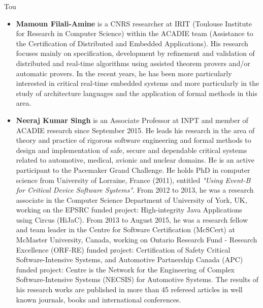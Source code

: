 \begin{sitedescription}{Tou}
\begin{itemize}
\item{\bf  Mamoun Filali-Amine}  is a CNRS researcher at IRIT (Toulouse Institute for Research in Computer Science)
within the ACADIE team (Assistance to the Certification of Distributed and Embedded Applications).
His research focuses mainly on specification, development by refinement and validation of distributed and real-time algorithms using  assisted theorem provers and/or automatic provers. In the recent years, he has been more particularly interested in critical real-time embedded systems and more particularly in the study of architecture languages and the application of formal methods in this area.


\item{\bf   Neeraj Kumar Singh} is an Associate Professor at INPT and member of  ACADIE research since September 2015. He leads his research in the area of theory and practice of rigorous software engineering and formal methods to design and implementation of safe, secure and dependable critical systems related to automotive, medical, avionic and nuclear domains. He is an active participant to the Pacemaker Grand Challenge. He holds PhD in computer science from University of Lorraine, France (2011), entitled  \textit{"Using Event-B for Critical Device Software Systems"}. From  2012 to  2013, he was a research associate in the Computer Science Department of University of York, UK, working on the  EPSRC funded project: High-integrity Java Applications using Circus (HiJaC). From 2013 to August 2015, he was a research fellow and team leader in the Centre for Software Certification (McSCert) at McMaster University, Canada, working on Ontario Research Fund - Research Excellence (ORF-RE) funded project: Certification of Safety Critical Software-Intensive Systems, and Automotive Partnership Canada (APC) funded project: Centre is the Network for the Engineering of Complex Software-Intensive Systems (NECSIS) for Automotive Systems.  The results of his research works are published in more than 45 refereed articles in well known journals, books and international conferences.




\end{itemize}

\end{sitedescription}

